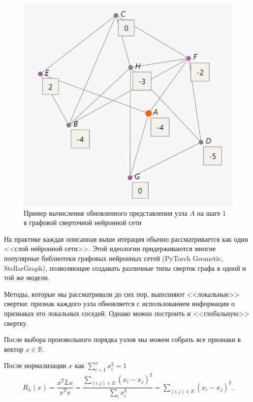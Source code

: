 \documentclass[%
	11pt,
	a4paper,
	utf8,
		]{article}
\begin{document}
\begin{figure}[h]
	\centering
	\includegraphics[scale=0.5]{figures/GCN.png}
	\caption{ Пример вычисления обновленного представления узла $ A $ на шаге 1 \\в графовой сверточной нейронной сети }\label{fig:GCN}
\end{figure}

На практике каждая описанная выше итерация обычно рассматривается как один <<слой нейронной сети>>. Этой идеологии придерживаются многие популярные библиотеки графовых нейронных сетей (PyTorch Geometic, StellarGraph), позволяющие создавать различные типы сверток графа в одной и той же модели.

Методы, которые мы рассматривали до сих пор, выполняют <<локальные>> свертки: признак каждого узла обновляется с использованием информации о признаках его локальных соседей. Однако можно построить и <<глобальную>> свертку.

После выбора произвольного порядка узлов мы можем собрать все признаки в вектор $ x \in \mathbb{R} $.

После нормализации $ x $ как $ \sum\limits_{i=1}^n x_i^2 = 1 $
\begin{align*}
	R_L(x) = \dfrac{ x^T Lx }{ x^T x} = \dfrac{ \sum_{(i,j) \in E} (x_i - x_j)^2 }{ \sum_i x_i^2 } = \sum_{ (i, j) \in E } (x_i - x_j)^2.
\end{align*} 
\end{document}

